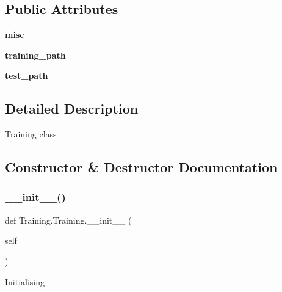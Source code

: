 \subsection*{Public Attributes}
\begin{DoxyCompactItemize}
\item 
\mbox{\label{class_training_1_1_training_ae69d9ae3cd16d5ec81d4386205fcd558}} 
{\bfseries misc}
\item 
\mbox{\label{class_training_1_1_training_a2b03b592f1b0db8a9990845bbeb47962}} 
{\bfseries training\+\_\+path}
\item 
\mbox{\label{class_training_1_1_training_a2b44dd14eec8536c54727936be9325b8}} 
{\bfseries test\+\_\+path}
\end{DoxyCompactItemize}


\subsection{Detailed Description}
\begin{DoxyVerb}Training class
\end{DoxyVerb}
 

\subsection{Constructor \& Destructor Documentation}
\mbox{\label{class_training_1_1_training_aa5c3c606edf57118d04ce14e3bc5704d}} 
\subsubsection{\texorpdfstring{\+\_\+\+\_\+init\+\_\+\+\_\+()}{\_\_init\_\_()}}
{\footnotesize\ttfamily def Training.\+Training.\+\_\+\+\_\+init\+\_\+\+\_\+ (\begin{DoxyParamCaption}\item[{}]{self }\end{DoxyParamCaption})}

\begin{DoxyVerb}Initialising
\end{DoxyVerb}
 

